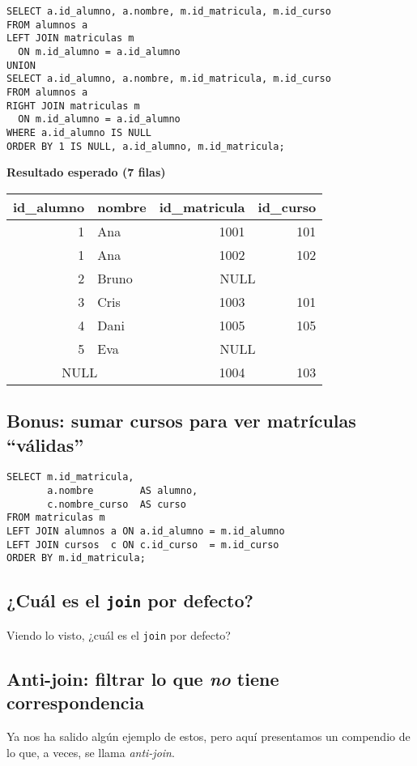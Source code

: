 \documentclass[11pt,a4paper]{article}
\begin{document}
\begin{lstlisting}
SELECT a.id_alumno, a.nombre, m.id_matricula, m.id_curso
FROM alumnos a
LEFT JOIN matriculas m
  ON m.id_alumno = a.id_alumno
UNION
SELECT a.id_alumno, a.nombre, m.id_matricula, m.id_curso
FROM alumnos a
RIGHT JOIN matriculas m
  ON m.id_alumno = a.id_alumno
WHERE a.id_alumno IS NULL
ORDER BY 1 IS NULL, a.id_alumno, m.id_matricula;
\end{lstlisting}

\textbf{Resultado esperado (7 filas)}
\begin{center}
\begin{tabular}{r l r r}
\toprule
id\_alumno & nombre & id\_matricula & id\_curso \\
\midrule
1   & Ana   & 1001 & 101 \\
1   & Ana   & 1002 & 102 \\
2   & Bruno & \multicolumn{2}{c}{NULL} \\
3   & Cris  & 1003 & 101 \\
4   & Dani  & 1005 & 105 \\
5   & Eva   & \multicolumn{2}{c}{NULL} \\
\multicolumn{2}{c}{NULL} & 1004 & 103 \\
\bottomrule
\end{tabular}
\end{center}

\subsection*{Bonus: sumar cursos para ver matrículas “válidas”}
\begin{lstlisting}
SELECT m.id_matricula,
       a.nombre        AS alumno,
       c.nombre_curso  AS curso
FROM matriculas m
LEFT JOIN alumnos a ON a.id_alumno = m.id_alumno
LEFT JOIN cursos  c ON c.id_curso  = m.id_curso
ORDER BY m.id_matricula;
\end{lstlisting}

\subsection*{¿Cuál es el \texttt{join} por defecto?}
Viendo lo visto, ¿cuál es el \texttt{join} por defecto?

\subsection*{Anti-join: filtrar lo que \emph{no} tiene correspondencia}
Ya nos ha salido algún ejemplo de estos, pero aquí presentamos un compendio de lo que, a veces, se llama \textit{anti-join}.
\end{document}
